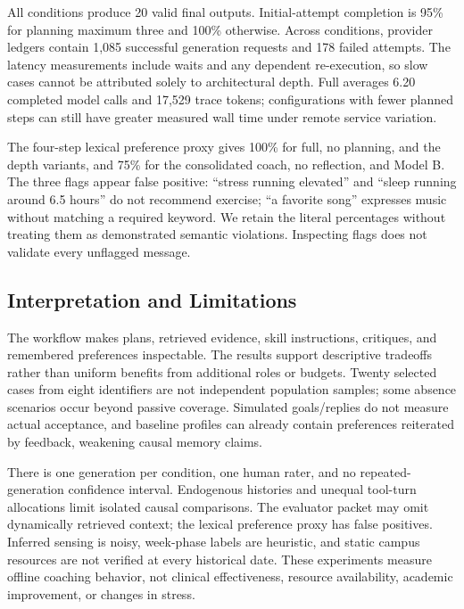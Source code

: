 \documentclass{article}
\begin{document}
All conditions produce 20 valid final outputs. Initial-attempt completion is 95\% for planning maximum three and 100\% otherwise. Across conditions, provider ledgers contain 1,085 successful generation requests and 178 failed attempts. The latency measurements include waits and any dependent re-execution, so slow cases cannot be attributed solely to architectural depth. Full averages 6.20 completed model calls and 17,529 trace tokens; configurations with fewer planned steps can still have greater measured wall time under remote service variation.

The four-step lexical preference proxy gives 100\% for full, no planning, and the depth variants, and 75\% for the consolidated coach, no reflection, and Model B. The three flags appear false positive: ``stress running elevated'' and ``sleep running around 6.5 hours'' do not recommend exercise; ``a favorite song'' expresses music without matching a required keyword. We retain the literal percentages without treating them as demonstrated semantic violations. Inspecting flags does not validate every unflagged message.

\FloatBarrier
\subsection{Interpretation and Limitations}
The workflow makes plans, retrieved evidence, skill instructions, critiques, and remembered preferences inspectable. The results support descriptive tradeoffs rather than uniform benefits from additional roles or budgets. Twenty selected cases from eight identifiers are not independent population samples; some absence scenarios occur beyond passive coverage. Simulated goals/replies do not measure actual acceptance, and baseline profiles can already contain preferences reiterated by feedback, weakening causal memory claims.

There is one generation per condition, one human rater, and no repeated-generation confidence interval. Endogenous histories and unequal tool-turn allocations limit isolated causal comparisons. The evaluator packet may omit dynamically retrieved context; the lexical preference proxy has false positives. Inferred sensing is noisy, week-phase labels are heuristic, and static campus resources are not verified at every historical date. These experiments measure offline coaching behavior, not clinical effectiveness, resource availability, academic improvement, or changes in stress.
\end{document}
